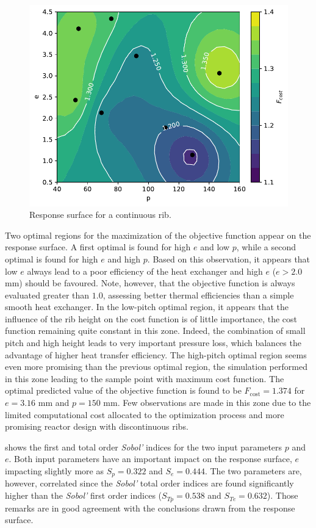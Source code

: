 \begin{figure}[ht]
\centering
\includegraphics[width=0.7\linewidth,keepaspectratio]{fig/applications/optim/GP_continuous.pdf}
\caption{Response surface for a continuous rib.}
\label{continuous_RS}
\end{figure}

Two optimal regions for the maximization of the objective function appear on the response surface. A first optimal is found for high $e$ and low $p$, while a second optimal is found for high $e$ and high $p$. Based on this observation, it appears that low $e$ always lead to a poor efficiency of the heat exchanger and high $e$ ($e > 2.0$ mm) should be favoured. Note, however, that the objective function is always evaluated greater than $1.0$, assessing better thermal efficiencies than a simple smooth heat exchanger. In the low-pitch optimal region, it appears that the influence of the rib height on the cost function is of little importance, the cost function remaining quite constant in this zone. Indeed, the combination of small pitch and high height leads to very important pressure loss, which balances the advantage of higher heat transfer efficiency. The high-pitch optimal region seems even more promising than the previous optimal region, the simulation performed in this zone leading to the sample point with maximum cost function. The optimal predicted value of the objective function is found to be $F_{\text{cost}} = 1.374$ for $e = 3.16$ mm and $p = 150$ mm. Few observations are made in this zone due to the limited computational cost allocated to the optimization process and more promising reactor design with discontinuous ribs.

 shows the first and total order \emph{Sobol'} indices for the two input parameters $p$ and $e$. Both input parameters have an important impact on the response surface, $e$ impacting slightly more as $S_p = 0.322$ and $S_e = 0.444$. The two parameters are, however, correlated since the \emph{Sobol'} total order indices are found significantly higher than the \emph{Sobol'} first order indices ($S_{Tp} = 0.538$ and $S_{Te} = 0.632$). Those remarks are in good agreement with the conclusions drawn from the response surface. 

